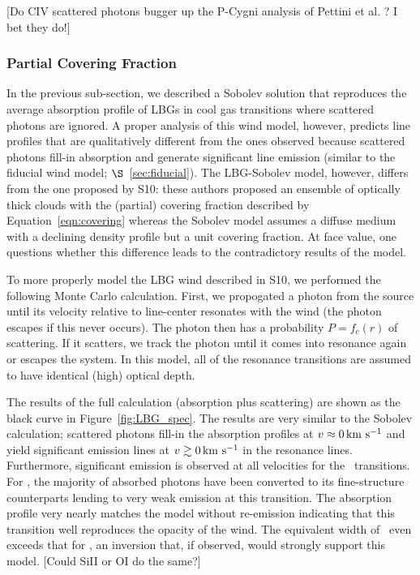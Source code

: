 \documentclass[12pt,preprint]{aastex}
\begin{document}
[Do CIV scattered photons bugger up the P-Cygni analysis of Pettini
et al. ? I bet they do!]
 
\subsubsection{Partial Covering Fraction}
\label{sec:Covering}

In the previous sub-section, we described a Sobolev solution that
reproduces the average absorption profile of LBGs in cool gas
transitions where scattered photons are ignored.  A proper analysis of
this wind model, however, predicts line profiles that are qualitatively
different from the ones observed because scattered photons fill-in
absorption and generate significant line emission (similar to the
fiducial wind model; $\S$~\ref{sec:fiducial}).
The LBG-Sobolev model, however, differs from
the one proposed by S10:  these authors proposed an ensemble of optically
thick clouds with the (partial) covering fraction described by
Equation~\ref{eqn:covering} whereas the Sobolev model assumes
a diffuse medium with a declining density profile but a unit covering
fraction.  At face value, one questions whether this difference leads to
the contradictory results of the model. 

To more properly model the LBG wind described in S10, we 
performed the following Monte Carlo calculation.  First, we propogated
a photon from the source until its velocity relative to line-center
resonates with the wind (the photon escapes if this never occurs).
The photon then has a probability $P = f_c(r)$ of scattering.  If it
scatters, we track the photon until it comes into
resonance again or escapes the system.  In this model, all of the
resonance transitions are assumed to have identical (high) optical
depth. 

The results of the full calculation (absorption plus scattering) are
shown as the black curve in Figure~\ref{fig:LBG_spec}.  The results
are very similar to the Sobolev calculation; scattered photons fill-in
the absorption profiles at $v \approx 0 \, {\rm km~s^{-1}}$ and yield significant
emission lines at $v \gtrsim 0 \, {\rm km~s^{-1}}$ in the resonance
lines. Furthermore, significant emission is observed at
all velocities for the \feiis\ transitions.  For \feiia,
the majority of absorbed photons have been converted to its
fine-structure counterparts lending to very weak emission at this
transition. The absorption profile very nearly matches the
model without re-emission indicating that this transition well
reproduces the opacity of the wind.  
The equivalent width of \feiia\ even exceeds that for \feiib, an
inversion that, if observed, would strongly support this model.
[Could SiII or OI do the same?]
\end{document}
